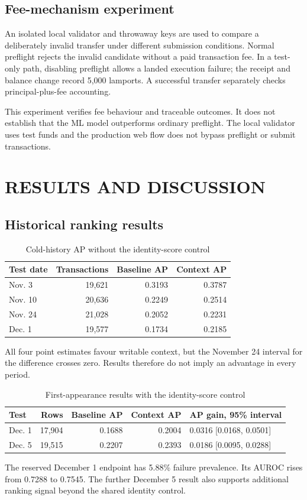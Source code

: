 \documentclass[12pt,a4paper,oneside]{report}
\begin{document}
\section{Fee-mechanism experiment}
An isolated local validator and throwaway keys are used to compare a deliberately invalid transfer under different submission conditions. Normal preflight rejects the invalid candidate without a paid transaction fee. In a test-only path, disabling preflight allows a landed execution failure; the receipt and balance change record 5,000 lamports. A successful transfer separately checks principal-plus-fee accounting.

This experiment verifies fee behaviour and traceable outcomes. It does not establish that the ML model outperforms ordinary preflight. The local validator uses test funds and the production web flow does not bypass preflight or submit transactions.
\chapter{RESULTS AND DISCUSSION}
\section{Historical ranking results}
\begin{table}[ht]\centering\caption{Cold-history AP without the identity-score control}
\begin{tabular}{lrrr}\toprule Test date&Transactions&Baseline AP&Context AP\\\midrule Nov. 3&19,621&0.3193&0.3787\\Nov. 10&20,636&0.2249&0.2514\\Nov. 24&21,028&0.2052&0.2231\\Dec. 1&19,577&0.1734&0.2185\\\bottomrule\end{tabular}\end{table}
All four point estimates favour writable context, but the November 24 interval for the difference crosses zero. Results therefore do not imply an advantage in every period.
\begin{table}[ht]\centering\caption{First-appearance results with the identity-score control}
\small\begin{tabularx}{\textwidth}{lrrrY}\toprule Test&Rows&Baseline AP&Context AP&AP gain, 95\% interval\\\midrule Dec. 1&17,904&0.1688&0.2004&0.0316 [0.0168, 0.0501]\\Dec. 5&19,515&0.2207&0.2393&0.0186 [0.0095, 0.0288]\\\bottomrule\end{tabularx}\end{table}
The reserved December 1 endpoint has 5.88\% failure prevalence. Its AUROC rises from 0.7288 to 0.7545. The further December 5 result also supports additional ranking signal beyond the shared identity control.
\end{document}

